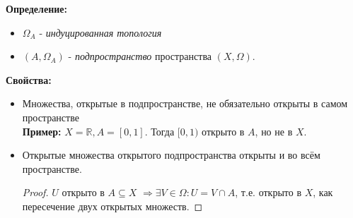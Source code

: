 \documentclass[a4paper,100pt]{article}
\theoremstyle{indented}
\begin{document}
\textbf{Определение:} 
\begin{itemize}
    \item $\Omega_A$ - \textit{индуцированная топология}
    \item $(A, \Omega_A)$ - \textit{подпространство} пространства $(X, \Omega)$.
\end{itemize}
\textbf{Свойства:}
\begin{itemize}
    \item Множества, открытые в подпространстве, не обязательно открыты в самом пространстве
    \\
    \textbf{Пример:} $X=\mathbb{R}, A=[0, 1]$. Тогда $[0, 1)$ открыто в $A$, но не в $X$.
    
    \item Открытые множества открытого подпространства открыты и во всём пространстве.
    \begin{proof} $U$ открыто в $A \subseteq X$ $\Rightarrow \exists V \in \Omega : U=V \cap A$, т.е. открыто в $X$, как пересечение двух открытых множеств.
    \end{proof}


\end{itemize}
\end{document}
